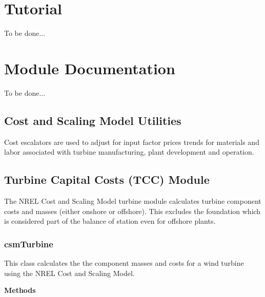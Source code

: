 \documentclass[letterpaper,10pt,openany,oneside]{sphinxmanual}
\begin{document}
\chapter{Tutorial}
\label{tutorial:tutorial-label}\label{tutorial::doc}\label{tutorial:tutorial}
To be done...


\chapter{Module Documentation}
\label{documentation::doc}\label{documentation:module-documentation}
To be done...


\section{Cost and Scaling Model Utilities}
\label{documentation:cost-and-scaling-model-utilities}
Cost escalators are used to adjust for input factor prices trends for materials and labor associated with turbine manufacturing, plant development and operation.


\section{Turbine Capital Costs (TCC) Module}
\label{documentation:turbine-capital-costs-tcc-module}\label{documentation:module-csm.src.csmTurbine}
The NREL Cost and Scaling Model turbine module calculates turbine component costs and masses (either onshore or offshore).  This excludes the foundation which is considered part of the balance of station even for offshore plants.


\subsection{csmTurbine}
\label{documentation:csmturbine}
This class calculates the the component masses and costs for a wind turbine using the NREL Cost and Scaling Model.

\begin{fulllineitems}
\label{documentation:csm.src.csmTurbine.csmTurbine}
\end{fulllineitems}


\textbf{Methods}
\end{document}
